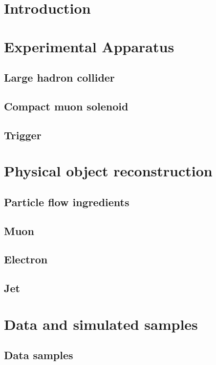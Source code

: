\documentclass[10pt,a4paper,twoside]{report}
\begin{document}
\tableofcontents
\raggedbottom
\listoffigures
\listoftables

\chapter{Introduction}
    
\chapter{Experimental Apparatus}\label{sec:detector}
    
    \section{Large hadron collider}
    
    \section{Compact muon solenoid}
    
    \section{Trigger}
    
\chapter{Physical object reconstruction}\label{sec:selection}
    
    \section{Particle flow ingredients}
    
    \section{Muon}
    
    \section{Electron}
    
    \section{Jet}
    
\chapter{Data and simulated samples}
    \section{Data samples}
    
\end{document}
